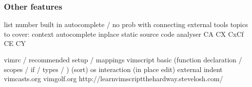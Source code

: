 \documentclass{beamer}
\begin{document}
\begin{frame}
  \frametitle{Other features}
  list number
    built in autocomplete / no prob with connecting external tools
    topics to cover:
    context autocomplete
    inplace static source code analyser
    CA CX CxCf CE CY
\end{frame}

\begin{frame}
    vimrc / recommended setup / mappings vimscript basic (function declaration / scopes / if / types / )
    (sort)
    os interaction (in place edit)
    external indent
    vimcasts.org
    vimgolf.org
    http://learnvimscriptthehardway.stevelosh.com/
\end{frame}
\end{document}
